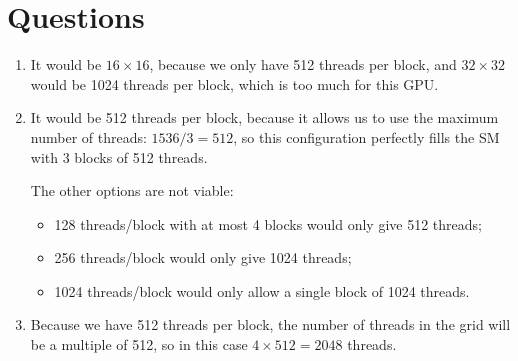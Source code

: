 \documentclass{report}
\begin{document}
\section{Questions}

\begin{enumerate}
    \item It would be $16\times16$, because we only have 512 threads per block, and $32\times32$ would be 1024 threads per block, which is too much for this GPU.

    \item It would be 512 threads per block, because it allows us to use the maximum number of threads: $1536 / 3 = 512$, so this configuration perfectly fills the SM with 3 blocks of 512 threads.

    The other options are not viable:
    \begin{itemize}
        \item 128 threads/block with at most 4 blocks would only give 512 threads;
        \item 256 threads/block would only give 1024 threads;
        \item 1024 threads/block would only allow a single block of 1024 threads.
    \end{itemize}

    \item Because we have 512 threads per block, the number of threads in the grid will be a multiple of 512, so in this case $4 \times 512 = 2048$ threads.
\end{enumerate}
\end{document}
